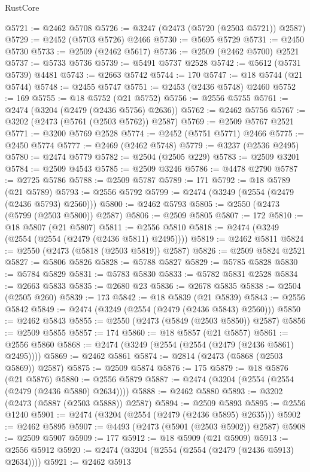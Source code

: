 \begin{lexlean}{RustCore}
\begin{coremodule}
@5721 := @2462 @5708
@5726 := @3247 (@2473 (@5720 (@2503 @5721)) @2587)
@5729 := @2452 (@5703 @5726) @2466
@5730 := @5695 @5729
@5731 := @2450 @5730
@5733 := @2509 (@2462 @5617)
@5736 := @2509 (@2462 @5700) @2521
@5737 := @5733 @5736
@5739 := @5491 @5737 @2528
@5742 := @5612 (@5731 @5739) @4481
@5743 := @2663 @5742
@5744 := 170
@5747 := @18 @5744 (@21 @5744)
@5748 := @2455 @5747
@5751 := @2453 (@2436 @5748) @2460
@5752 := 169
@5755 := @18 @5752 (@21 @5752)
@5756 := @2556 @5755
@5761 := @2474 (@3204 (@2479 (@2436 @5756) @2636))
@5762 := @2462 @5756
@5767 := @3202 (@2473 (@5761 (@2503 @5762)) @2587)
@5769 := @2509 @5767 @2521
@5771 := @3200 @5769 @2528
@5774 := @2452 (@5751 @5771) @2466
@5775 := @2450 @5774
@5777 := @2469 (@2462 @5748)
@5779 := @3237 (@2536 @2495)
@5780 := @2474 @5779
@5782 := @2504 (@2505 @229)
@5783 := @2509 @3201
@5784 := @2509 @4543
@5785 := @2509 @3246
@5786 := @4478 @2790
@5787 := @2725 @5786
@5788 := @2509 @5787
@5789 := 171
@5792 := @18 @5789 (@21 @5789)
@5793 := @2556 @5792
@5799 := @2474 (@3249 (@2554 (@2479 (@2436 @5793) @2560)))
@5800 := @2462 @5793
@5805 := @2550 (@2473 (@5799 (@2503 @5800)) @2587)
@5806 := @2509 @5805
@5807 := 172
@5810 := @18 @5807 (@21 @5807)
@5811 := @2556 @5810
@5818 := @2474 (@3249 (@2554 (@2554 (@2479 (@2436 @5811) @2495))))
@5819 := @2462 @5811
@5824 := @2550 (@2473 (@5818 (@2503 @5819)) @2587)
@5826 := @2509 @5824 @2521
@5827 := @5806 @5826
@5828 := @5788 @5827
@5829 := @5785 @5828
@5830 := @5784 @5829
@5831 := @5783 @5830
@5833 := @5782 @5831 @2528
@5834 := @2663 @5833
@5835 := @2680 @23
@5836 := @2678 @5835
@5838 := @2504 (@2505 @260)
@5839 := 173
@5842 := @18 @5839 (@21 @5839)
@5843 := @2556 @5842
@5849 := @2474 (@3249 (@2554 (@2479 (@2436 @5843) @2560)))
@5850 := @2462 @5843
@5855 := @2550 (@2473 (@5849 (@2503 @5850)) @2587)
@5856 := @2509 @5855
@5857 := 174
@5860 := @18 @5857 (@21 @5857)
@5861 := @2556 @5860
@5868 := @2474 (@3249 (@2554 (@2554 (@2479 (@2436 @5861) @2495))))
@5869 := @2462 @5861
@5874 := @2814 (@2473 (@5868 (@2503 @5869)) @2587)
@5875 := @2509 @5874
@5876 := 175
@5879 := @18 @5876 (@21 @5876)
@5880 := @2556 @5879
@5887 := @2474 (@3204 (@2554 (@2554 (@2479 (@2436 @5880) @2634))))
@5888 := @2462 @5880
@5893 := @3202 (@2473 (@5887 (@2503 @5888)) @2587)
@5894 := @2509 @5893
@5895 := @2556 @1240
@5901 := @2474 (@3204 (@2554 (@2479 (@2436 @5895) @2635)))
@5902 := @2462 @5895
@5907 := @4493 (@2473 (@5901 (@2503 @5902)) @2587)
@5908 := @2509 @5907
@5909 := 177
@5912 := @18 @5909 (@21 @5909)
@5913 := @2556 @5912
@5920 := @2474 (@3204 (@2554 (@2554 (@2479 (@2436 @5913) @2634))))
@5921 := @2462 @5913

\end{coremodule}
\end{lexlean}
